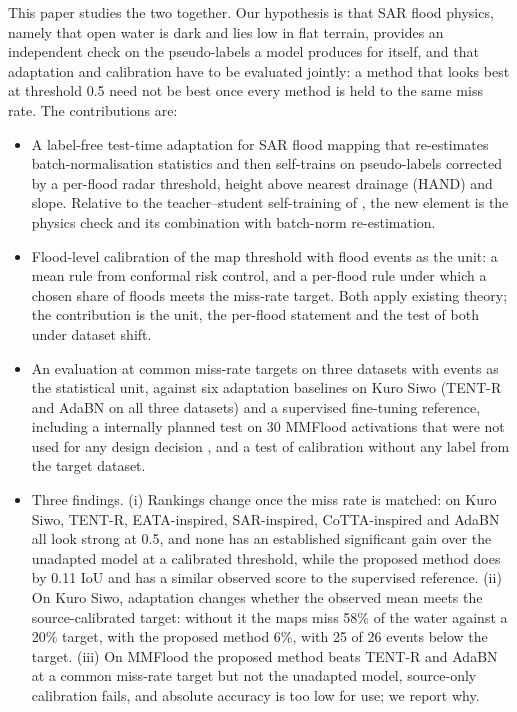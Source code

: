 \documentclass[a4paper,fleqn]{cas-sc}
\begin{document}
This paper studies the two together. Our hypothesis is that SAR flood physics, namely that open water is dark and lies low in flat terrain, provides an independent check on the pseudo-labels a model produces for itself, and that adaptation and calibration have to be evaluated jointly: a method that looks best at threshold 0.5 need not be best once every method is held to the same miss rate. The contributions are:
\begin{itemize}
\item A label-free test-time adaptation for SAR flood mapping that re-estimates batch-normalisation statistics and then self-trains on pseudo-labels corrected by a per-flood radar threshold, height above nearest drainage (HAND) \citep{renno2008hand,nobre2011hand} and slope. Relative to the teacher--student self-training of \citet{chen2026cimttda}, the new element is the physics check and its combination with batch-norm re-estimation.
\item Flood-level calibration of the map threshold with flood events as the unit: a mean rule from conformal risk control, and a per-flood rule under which a chosen share of floods meets the miss-rate target. Both apply existing theory; the contribution is the unit, the per-flood statement and the test of both under dataset shift.
\item An evaluation at common miss-rate targets on three datasets with events as the statistical unit, against six adaptation baselines on Kuro Siwo (TENT-R and AdaBN on all three datasets) and a supervised fine-tuning reference, including a internally planned test on 30 MMFlood activations that were not used for any design decision \citep{nosek2018prereg}, and a test of calibration without any label from the target dataset.
\item Three findings. (i) Rankings change once the miss rate is matched: on Kuro Siwo, TENT-R, EATA-inspired, SAR-inspired, CoTTA-inspired and AdaBN all look strong at 0.5, and none has an established significant gain over the unadapted model at a calibrated threshold, while the proposed method does by 0.11 IoU and has a similar observed score to the supervised reference. (ii) On Kuro Siwo, adaptation changes whether the observed mean meets the source-calibrated target: without it the maps miss 58\% of the water against a 20\% target, with the proposed method 6\%, with 25 of 26 events below the target. (iii) On MMFlood the proposed method beats TENT-R and AdaBN at a common miss-rate target but not the unadapted model, source-only calibration fails, and absolute accuracy is too low for use; we report why.
\end{itemize}
\end{document}
